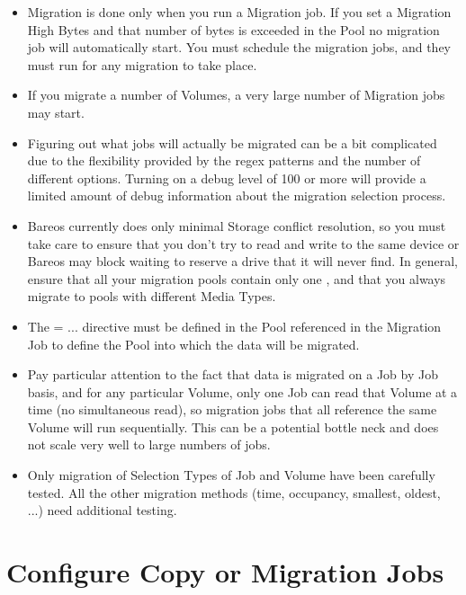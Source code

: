 \begin{itemize}
\item Migration is done only when you run a Migration job. If you set a
      Migration High Bytes and that number of bytes is exceeded in the Pool
      no migration job will automatically start.  You must schedule the
      migration jobs, and they must run for any migration to take place.

\item If you migrate a number of Volumes, a very large number of Migration
      jobs may start.

\item Figuring out what jobs will actually be migrated can be a bit complicated
      due to the flexibility provided by the regex patterns and the number of
      different options.  Turning on a debug level of 100 or more will provide
      a limited amount of debug information about the migration selection
      process.

\item Bareos currently does only minimal Storage conflict resolution, so you
      must take care to ensure that you don't try to read and write to the
      same device or Bareos may block waiting to reserve a drive that it
      will never find. In general, ensure that all your migration
      pools contain only one ,
      and that you always
      migrate to pools with different Media Types.

\item The  = ... directive must be defined in the Pool
     referenced in the Migration Job to define the Pool into which the
     data will be migrated.

\item Pay particular attention to the fact that data is migrated on a Job
     by Job basis, and for any particular Volume, only one Job can read
     that Volume at a time (no simultaneous read), so migration jobs that
     all reference the same Volume will run sequentially.  This can be a
     potential bottle neck and does not scale very well to large numbers
     of jobs.

\item Only migration of Selection Types of Job and Volume have
     been carefully tested. All the other migration methods (time,
     occupancy, smallest, oldest, ...) need additional testing.
\end{itemize}

\section{Configure Copy or Migration Jobs}

